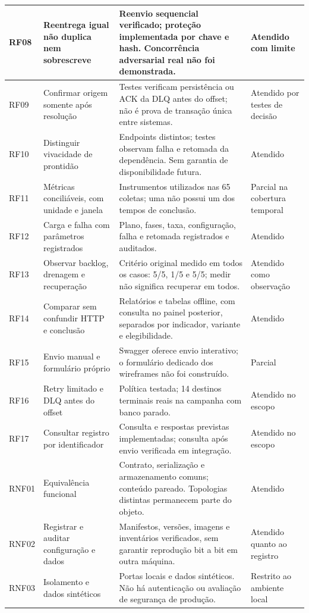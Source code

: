 {\begin{longtable}{p{}p{}p{}p{}}
RF08 & Reentrega igual não duplica nem sobrescreve & Reenvio sequencial verificado; proteção implementada por chave e hash. Concorrência adversarial real não foi demonstrada. & Atendido com limite\\ \hline
RF09 & Confirmar origem somente após resolução & Testes verificam persistência ou ACK da DLQ antes do offset; não é prova de transação única entre sistemas. & Atendido por testes de decisão\\ \hline
RF10 & Distinguir vivacidade de prontidão & Endpoints distintos; testes observam falha e retomada da dependência. Sem garantia de disponibilidade futura. & Atendido\\ \hline
RF11 & Métricas conciliáveis, com unidade e janela & Instrumentos utilizados nas 65 coletas; uma não possui um dos tempos de conclusão. & Parcial na cobertura temporal\\ \hline
RF12 & Carga e falha com parâmetros registrados & Plano, fases, taxa, configuração, falha e retomada registrados e auditados. & Atendido\\ \hline
RF13 & Observar backlog, drenagem e recuperação & Critério original medido em todos os casos: 5/5, 1/5 e 5/5; medir não significa recuperar em todos. & Atendido como observação\\ \hline
RF14 & Comparar sem confundir HTTP e conclusão & Relatórios e tabelas offline, com consulta no painel posterior, separados por indicador, variante e elegibilidade. & Atendido\\ \hline
RF15 & Envio manual e formulário próprio & Swagger oferece envio interativo; o formulário dedicado dos wireframes não foi construído. & Parcial\\ \hline
RF16 & Retry limitado e DLQ antes do offset & Política testada; 14 destinos terminais reais na campanha com banco parado. & Atendido no escopo\\ \hline
RF17 & Consultar registro por identificador & Consulta e respostas previstas implementadas; consulta após envio verificada em integração. & Atendido no escopo\\ \hline
RNF01 & Equivalência funcional & Contrato, serialização e armazenamento comuns; conteúdo pareado. Topologias distintas permanecem parte do objeto. & Atendido\\ \hline
RNF02 & Registrar e auditar configuração e dados & Manifestos, versões, imagens e inventários verificados, sem garantir reprodução bit a bit em outra máquina. & Atendido quanto ao registro\\ \hline
RNF03 & Isolamento e dados sintéticos & Portas locais e dados sintéticos. Não há autenticação ou avaliação de segurança de produção. & Restrito ao ambiente local\\ \hline

\end{longtable}}
